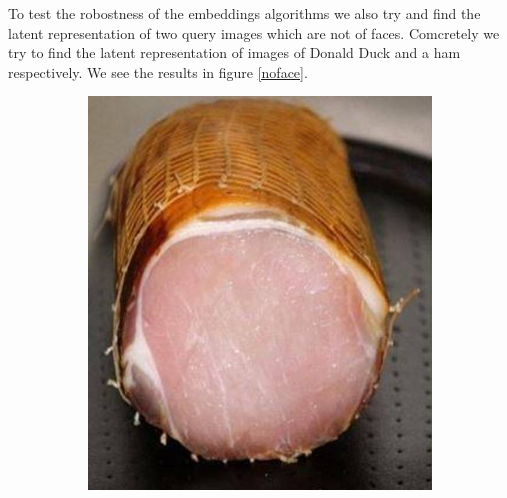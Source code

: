 To test the robostness of the embeddings algorithms we also try and find the latent representation of two query images which are not of faces. Comcretely we try to find the latent representation of images of Donald Duck and a ham respectively. We see the results in figure \ref{noface}. 


\begin{figure}[h!]
    \centering
    \begin{subfigure}[b]{0.24\textwidth}
        \includegraphics[width=\textwidth]{fig/stylegan/noface/skinke}
    \end{subfigure}
    \begin{subfigure}[b]{0.24\textwidth}

\end{subfigure}
\end{figure}
